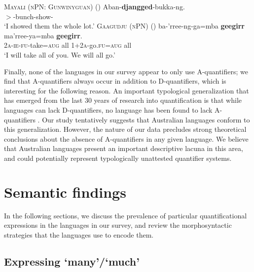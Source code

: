 \documentclass[12pt,egregdoesnotlikesansseriftitles]{scrartcl}
\begin{document}
\begin{exe}
  \ex\textsc{Mayali (nPN: Gunwinyguan)} \hfill(\citealt[233]{evans95})
  \gll Aban-\textbf{djangged}-bukka-ng.\\
  \First$>$\Tpl-bunch-show-\Pp\\
  \glt `I showed them the whole lot.' \label{quantscope2}
  \ex\textsc{Gaagudju (nPN)} \hfill(\citealt[307]{harvey92})
  \gll ba-'rree-ng-ga=mba \textbf{geegirr} ma'rree-ya=mba \textbf{geegirr}.\\ 
  2\textsc{a-ie-fu}-take=\textsc{aug} all 1+2\textsc{a}-go.\textsc{fu=aug} all\\
  \glt `I will take all of you. We will all go.' \label{quantscope3}
\end{exe}

Finally, none of the languages in our survey appear to only use A-quantifiers; we find that A-quantifiers always occur in addition to D-quantifiers, which is interesting for the following reason. An important typological generalization that has emerged from the last 30 years of research into quantification is that while languages can lack D-quantifiers, no language has been found to lack A-quantifiers \citep{introqnl}. Our study tentatively suggests that Australian languages  conform to this generalization. However, the nature of our data precludes strong theoretical conclusions about the absence of A-quantifiers in any given language. We believe that Australian languages present an important descriptive lacuna in this area, and could potentially represent typologically unattested quantifier systems.


\section{Semantic findings \label{individquantsection}}

In the following sections, we discuss the prevalence of particular quantificational expressions in the languages in our survey, and review the morphosyntactic strategies that the languages use to encode them.

\subsection{Expressing `many'/`much' \label{manymuchsection}}
\end{document}
